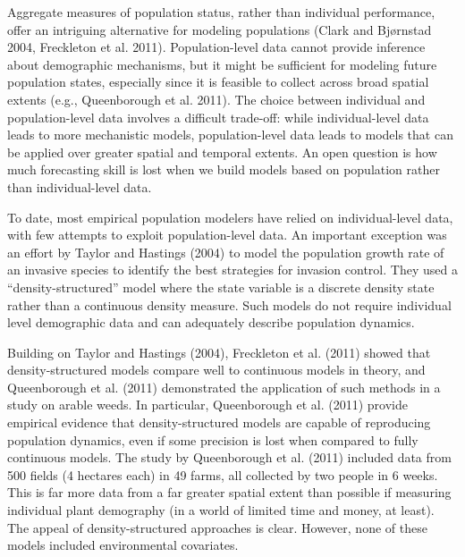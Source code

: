 \documentclass[12pt,]{article}
\begin{document}
Aggregate measures of population status, rather than individual
performance, offer an intriguing alternative for modeling populations
(Clark and Bjørnstad 2004, Freckleton et al. 2011). Population-level
data cannot provide inference about demographic mechanisms, but it might
be sufficient for modeling future population states, especially since it
is feasible to collect across broad spatial extents (e.g., Queenborough
et al. 2011). The choice between individual and population-level data
involves a difficult trade-off: while individual-level data leads to
more mechanistic models, population-level data leads to models that can
be applied over greater spatial and temporal extents. An open question
is how much forecasting skill is lost when we build models based on
population rather than individual-level data.

To date, most empirical population modelers have relied on
individual-level data, with few attempts to exploit population-level
data. An important exception was an effort by Taylor and Hastings (2004)
to model the population growth rate of an invasive species to identify
the best strategies for invasion control. They used a
``density-structured'' model where the state variable is a discrete
density state rather than a continuous density measure. Such models do
not require individual level demographic data and can adequately
describe population dynamics.

Building on Taylor and Hastings (2004), Freckleton et al. (2011) showed
that density-structured models compare well to continuous models in
theory, and Queenborough et al. (2011) demonstrated the application of
such methods in a study on arable weeds. In particular, Queenborough et
al. (2011) provide empirical evidence that density-structured models are
capable of reproducing population dynamics, even if some precision is
lost when compared to fully continuous models. The study by Queenborough
et al. (2011) included data from 500 fields (4 hectares each) in 49
farms, all collected by two people in 6 weeks. This is far more data
from a far greater spatial extent than possible if measuring individual
plant demography (in a world of limited time and money, at least). The
appeal of density-structured approaches is clear. However, none of these
models included environmental covariates.
\end{document}
